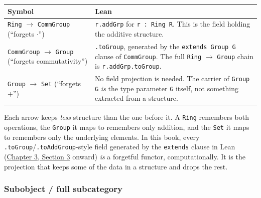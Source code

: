 \begin{center}

\end{center}

\begin{longtable}[]{@{}
  >{\raggedright\arraybackslash}p{}
  >{\raggedright\arraybackslash}p{}@{}}
\toprule\noalign{}
\begin{minipage}[b]{\linewidth}\raggedright
Symbol
\end{minipage} & \begin{minipage}[b]{\linewidth}\raggedright
Lean
\end{minipage} \\
\midrule\noalign{}
\endhead
\bottomrule\noalign{}
\endlastfoot
\texttt{Ring} \(\to\) \texttt{CommGroup} (``forgets \(\cdot\)'') & \texttt{r.addGrp} for \texttt{r : Ring R}. This is the field holding the additive structure. \\
\texttt{CommGroup} \(\to\) \texttt{Group} (``forgets commutativity'') & \texttt{.toGroup}, generated by the \texttt{extends Group G} clause of \texttt{CommGroup}. The full \texttt{Ring} \(\to\) \texttt{Group} chain is \texttt{r.addGrp.toGroup}. \\
\texttt{Group} \(\to\) \texttt{Set} (``forgets \(+\)'') & No field projection is needed. The carrier of \texttt{Group G} \emph{is} the type parameter \texttt{G} itself, not something extracted from a structure. \\
\end{longtable}

Each arrow keeps \emph{less} structure than the one before it. A \texttt{Ring} remembers both operations, the \texttt{Group} it maps to remembers only addition, and the \texttt{Set} it maps to remembers only the underlying elements. In this book, every \texttt{.toGroup}/\texttt{.toAddGroup}-style field generated by the \texttt{extends} clause in Lean (\hyperref[sec:03-functions-and-structures:03-extending-structures:1]{Chapter 3, Section 3} onward) \emph{is} a forgetful functor, computationally. It is the projection that keeps some of the data in a structure and drops the rest.

\subsubsection{Subobject / full subcategory}\label{sec:02-terminology-and-coc:01-terminology:10}

